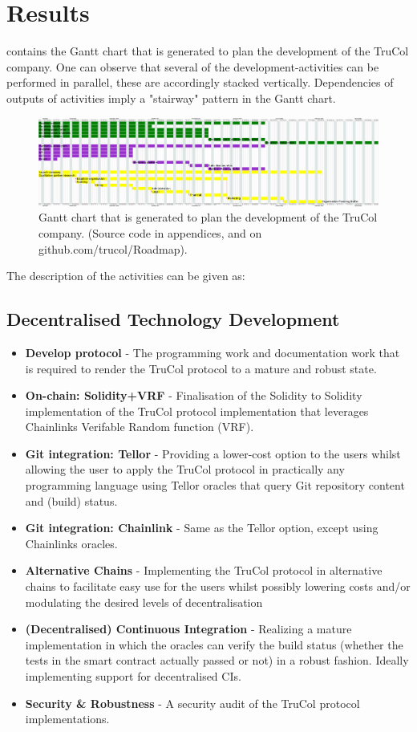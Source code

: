\section{Results}\label{sec:results}
%
 contains the Gantt chart that is generated to plan the development of the TruCol company. One can observe that several of the development-activities can be performed in parallel, these are accordingly stacked vertically. Dependencies of outputs of activities imply a "stairway" pattern in the Gantt chart. 
\clearpage
\begin{figure}
\hspace*{-0cm}   
    \includegraphics[width=775pt]{Images/created.png}
    \caption{Gantt chart that is generated to plan the development of the TruCol company. (Source code in appendices, and on github.com/trucol/Roadmap).}
    \label{fig:gantt}
\end{figure}
\clearpage
The description of the activities can be given as:
\subsection{Decentralised Technology Development}
\begin{itemize}
	\item \textbf{Develop protocol} - The programming work and documentation work that is required to render the TruCol protocol to a mature and robust state.
	\item \textbf{On-chain: Solidity+VRF} - Finalisation of the Solidity to Solidity implementation of the TruCol protocol implementation that leverages Chainlinks Verifable Random function (VRF).
	\item \textbf{Git integration: Tellor} - Providing a lower-cost option to the users whilst allowing the user to apply the TruCol protocol in practically any programming language using Tellor oracles that query Git repository content and (build) status.
	\item \textbf{Git integration: Chainlink} - Same as the Tellor option, except using Chainlinks oracles.
	\item \textbf{Alternative Chains} - Implementing the TruCol protocol in alternative chains to facilitate easy use for the users whilst possibly lowering costs and/or modulating the desired levels of decentralisation
	\item \textbf{(Decentralised) Continuous Integration} - Realizing a mature implementation in which the oracles can verify the build status (whether the tests in the smart contract actually passed or not) in a robust fashion. Ideally implementing support for decentralised CIs.
	\item \textbf{Security \& Robustness} - A security audit of the TruCol protocol implementations.
\end{itemize}

